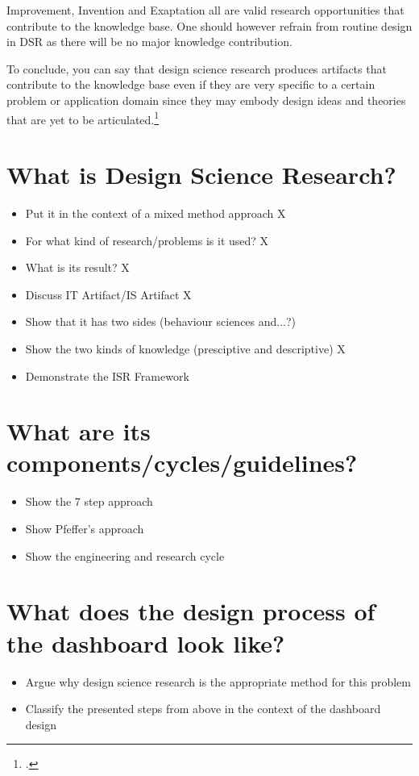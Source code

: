 Improvement, Invention and Exaptation all are valid research opportunities that contribute to the knowledge base. One should however refrain from routine design in DSR as there will be no major knowledge contribution.


To conclude, you can say that design science research produces artifacts that contribute to the knowledge base even if they are very specific to a certain problem or application domain since they may embody design ideas and theories that are yet to be articulated.\footcite[Cf.][p.340]{GregorPositioningpresentingdesign2013}

\section{What is Design Science Research?} 
\begin{itemize}
    \item Put it in the context of a mixed method approach X
    \item For what kind of research/problems is it used? X
    \item What is its result? X
    \item Discuss IT Artifact/IS Artifact X
    \item Show that it has two sides (behaviour sciences and...?)
    \item Show the two kinds of knowledge (presciptive and descriptive) X
    \item Demonstrate the ISR Framework
\end{itemize}


\section{What are its components/cycles/guidelines?}
\begin{itemize}
    \item Show the 7 step approach
    \item Show Pfeffer's approach
    \item Show the engineering and research cycle
\end{itemize}

\section{What does the design process of the dashboard look like?}
\begin{itemize}
    \item Argue why design science research is the appropriate method for this problem
    \item Classify the presented steps from above in the context of the dashboard design
\end{itemize}